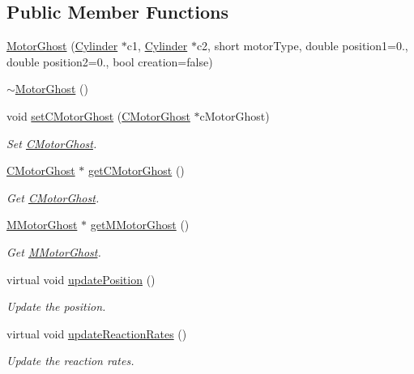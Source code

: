 \subsection*{Public Member Functions}
\begin{DoxyCompactItemize}
\item 
\hyperlink{classMotorGhost_a9ba4c13536cdb7b2e4a12bc9d55c5835}{Motor\+Ghost} (\hyperlink{classCylinder}{Cylinder} $\ast$c1, \hyperlink{classCylinder}{Cylinder} $\ast$c2, short motor\+Type, double position1=0., double position2=0., bool creation=false)
\item 
\hyperlink{classMotorGhost_a6b8892fc4742a822f51585d533aeb0e9}{$\sim$\+Motor\+Ghost} ()
\item 
void \hyperlink{classMotorGhost_a3bef182cfc2047f69a82b3a583aa9444}{set\+C\+Motor\+Ghost} (\hyperlink{classCMotorGhost}{C\+Motor\+Ghost} $\ast$c\+Motor\+Ghost)
\begin{DoxyCompactList}\small\item\em Set \hyperlink{classCMotorGhost}{C\+Motor\+Ghost}. \end{DoxyCompactList}\item 
\hyperlink{classCMotorGhost}{C\+Motor\+Ghost} $\ast$ \hyperlink{classMotorGhost_adb0f3b2729f8f28534993ceef444299a}{get\+C\+Motor\+Ghost} ()
\begin{DoxyCompactList}\small\item\em Get \hyperlink{classCMotorGhost}{C\+Motor\+Ghost}. \end{DoxyCompactList}\item 
\hyperlink{classMMotorGhost}{M\+Motor\+Ghost} $\ast$ \hyperlink{classMotorGhost_afd679c4de83f5cd0dfd870f7db069f32}{get\+M\+Motor\+Ghost} ()
\begin{DoxyCompactList}\small\item\em Get \hyperlink{classMMotorGhost}{M\+Motor\+Ghost}. \end{DoxyCompactList}\item 
virtual void \hyperlink{classMotorGhost_af5160d203173a203b91bfe2e1461acf8}{update\+Position} ()
\begin{DoxyCompactList}\small\item\em Update the position. \end{DoxyCompactList}\item 
virtual void \hyperlink{classMotorGhost_af04a329034d73a637f72afd14ec0709f}{update\+Reaction\+Rates} ()
\begin{DoxyCompactList}\small\item\em Update the reaction rates. \end{DoxyCompactList}\item 

\end{DoxyCompactItemize}
